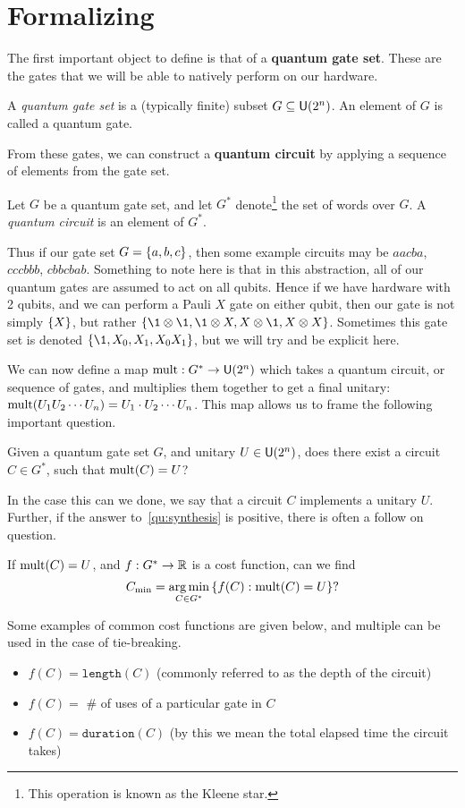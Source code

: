 \section{Formalizing}
The first important object to define is that of a \textbf{quantum gate set}.
These are the gates that we will be able to natively perform on our hardware.
\begin{definition}
    A \emph{quantum gate set} is a (typically finite) subset $G\subseteq \mathsf{U} (2^n)$. An element of $G$ is called a quantum gate.
\end{definition}
From these gates, we can construct a \textbf{quantum circuit} by applying a sequence of elements from the gate set.
\begin{definition}
    Let $G$ be a quantum gate set, and let $G^*$ denote\footnote{This operation is known as the Kleene star.} the set of words over $G$.
    A \emph{quantum circuit} is an element of $G^*$.
\end{definition}
Thus if our gate set $G = \qty{a, b, c}$, then some example circuits may be $aacba$, $cccbbb$, $cbbcbab$.
Something to note here is that in this abstraction, all of our quantum gates are assumed to act on all qubits.
Hence if we have hardware with 2 qubits, and we can perform a Pauli $X$ gate on either qubit, then our gate is not simply $\qty{X}$, but rather $\qty{\1\otimes \1, \1\otimes X, X\otimes \1, X\otimes X}$.
Sometimes this gate set is denoted $\qty{\1, X_0, X_1, X_0X_1}$, but we will try and be explicit here.

We can now define a map $\operatorname{mult}: G^* \to \mathsf{U} (2^n)$ which takes a quantum circuit, or sequence of gates, and multiplies them together to get a final unitary: $\operatorname{mult}(U_1U_2\cdots U_n) = U_1\cdot U_2\cdots U_n$.
This map allows us to frame the following important question.

\begin{question}\label{qu:synthesis}
    Given a quantum gate set $G$, and unitary $U\in\mathsf{U} (2^n)$, does there exist a circuit $C\in G^*$, such that $\operatorname{mult}(C) = U$?
\end{question}
In the case this can we done, we say that a circuit $C$ implements a unitary $U$.
Further, if the answer to~\ref{qu:synthesis} is positive, there is often a follow on question.
\begin{question}\label{qu:optimalsynthesis}
    If $\operatorname{mult}(C) = U$, and $f: G^* \to \mathbb{R}$ is a cost function, can we find
    \begin{equation*}
        C_\text{min} = \operatorname*{arg\,min}_{C\in G^*} \qty{f(C) : \operatorname{mult}(C) = U}?
    \end{equation*}
\end{question}
Some examples of common cost functions are given below, and multiple can be used in the case of tie-breaking.
\begin{itemize}
    \item $f(C) = \mathtt{length}(C)$ (commonly referred to as the depth of the circuit)
    \item $f(C) = $ \# of uses of a particular gate in $C$
    \item $f(C) = \mathtt{duration}(C)$ (by this we mean the total elapsed time the circuit takes)
\end{itemize}

